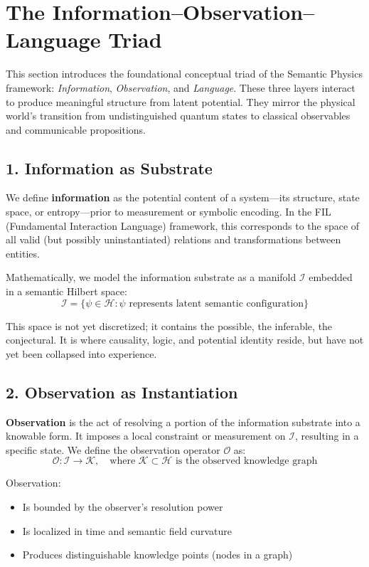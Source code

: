


\section*{The Information–Observation–Language Triad}

This section introduces the foundational conceptual triad of the Semantic Physics framework: \emph{Information}, \emph{Observation}, and \emph{Language}. These three layers interact to produce meaningful structure from latent potential. They mirror the physical world's transition from undistinguished quantum states to classical observables and communicable propositions.

\subsection*{1. Information as Substrate}

We define \textbf{information} as the potential content of a system---its structure, state space, or entropy---prior to measurement or symbolic encoding. In the FIL (Fundamental Interaction Language) framework, this corresponds to the space of all valid (but possibly uninstantiated) relations and transformations between entities.

Mathematically, we model the information substrate as a manifold $\mathcal{I}$ embedded in a semantic Hilbert space:
\[
\mathcal{I} = \{ \psi \in \mathcal{H} : \psi \text{ represents latent semantic configuration} \}
\]

This space is not yet discretized; it contains the possible, the inferable, the conjectural. It is where causality, logic, and potential identity reside, but have not yet been collapsed into experience.

\subsection*{2. Observation as Instantiation}

\textbf{Observation} is the act of resolving a portion of the information substrate into a knowable form. It imposes a local constraint or measurement on $\mathcal{I}$, resulting in a specific state. We define the observation operator $\mathcal{O}$ as:
\[
\mathcal{O} : \mathcal{I} \to \mathcal{K}, \quad \text{where } \mathcal{K} \subset \mathcal{H} \text{ is the observed knowledge graph}
\]

Observation:
\begin{itemize}
  \item Is bounded by the observer's resolution power
  \item Is localized in time and semantic field curvature
  \item Produces distinguishable knowledge points (nodes in a graph)
\end{itemize}

